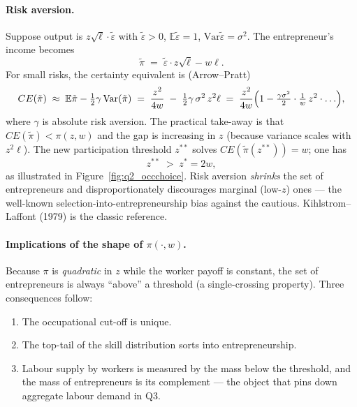 \documentclass[11pt,a4paper]{article}
\begin{document}
\paragraph{Risk aversion.}
Suppose output is $z\sqrt{\ell}\cdot\tilde\varepsilon$ with $\tilde\varepsilon>0$, $\mathbb{E}\tilde\varepsilon=1$, $\mathrm{Var}\tilde\varepsilon=\sigma^{2}$. The entrepreneur's income becomes
\[
\tilde \pi\;=\;\tilde\varepsilon\cdot z\sqrt{\ell}-w\ell.
\]
For small risks, the certainty equivalent is (Arrow--Pratt)
\[
CE(\tilde\pi)\;\approx\;\mathbb{E}\tilde\pi-\tfrac{1}{2}\gamma\,\mathrm{Var}(\tilde\pi)
\;=\;\frac{z^{2}}{4w}\;-\;\tfrac{1}{2}\gamma\,\sigma^{2}\,z^{2}\ell\;=\;\frac{z^{2}}{4w}\Bigl(1-\tfrac{\gamma\sigma^{2}}{2}\cdot\tfrac{1}{w}\,z^{2}\cdot\ldots\Bigr),
\]
where $\gamma$ is absolute risk aversion. The practical take-away is that $CE(\tilde\pi)<\pi(z,w)$ and the gap is increasing in $z$ (because variance scales with $z^{2}\ell$). The new participation threshold $z^{**}$ solves $CE(\tilde\pi(z^{**}))=w$; one has
\[
z^{**}\;>\;z^{*}=2w,
\]
as illustrated in Figure~\ref{fig:q2_occchoice}. Risk aversion \emph{shrinks} the set of entrepreneurs and disproportionately discourages marginal (low-$z$) ones --- the well-known selection-into-entrepreneurship bias against the cautious. Kihlstrom--Laffont (1979) is the classic reference.

\paragraph{Implications of the shape of $\pi(\cdot,w)$.}
Because $\pi$ is \emph{quadratic} in $z$ while the worker payoff is constant, the set of entrepreneurs is always ``above'' a threshold (a single-crossing property). Three consequences follow:
\begin{enumerate}[leftmargin=*,itemsep=1pt]
    \item The occupational cut-off is unique.
    \item The top-tail of the skill distribution sorts into entrepreneurship.
    \item Labour supply by workers is measured by the mass below the threshold, and the mass of entrepreneurs is its complement --- the object that pins down aggregate labour demand in Q3.
\end{enumerate}

\noindent{}
\end{document}
